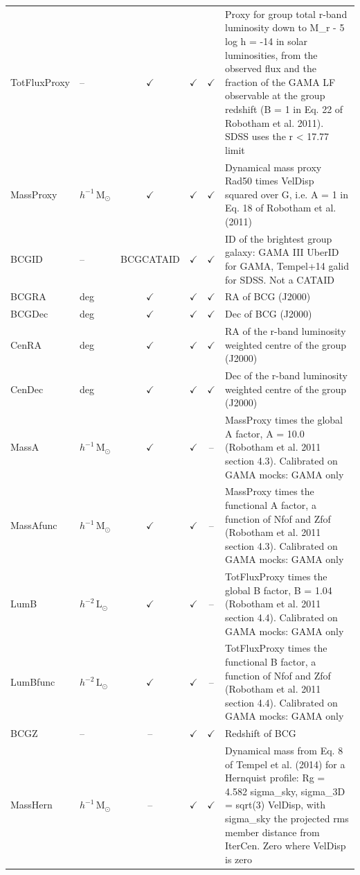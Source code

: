 \begin{tabular}{llcccp{7.5cm}}
TotFluxProxy & -- & $\checkmark$ & $\checkmark$ & $\checkmark$ & Proxy for group total r-band luminosity down to M\_r - 5 log h = -14 in solar luminosities, from the observed flux and the fraction of the GAMA LF observable at the group redshift (B = 1 in Eq. 22 of Robotham et al. 2011). SDSS uses the r < 17.77 limit \\
MassProxy & $h^{-1}\,\mathrm{M}_\odot$ & $\checkmark$ & $\checkmark$ & $\checkmark$ & Dynamical mass proxy Rad50 times VelDisp squared over G, i.e. A = 1 in Eq. 18 of Robotham et al. (2011) \\
BCGID & -- & BCGCATAID & $\checkmark$ & $\checkmark$ & ID of the brightest group galaxy: GAMA III UberID for GAMA, Tempel+14 galid for SDSS. Not a CATAID \\
BCGRA & deg & $\checkmark$ & $\checkmark$ & $\checkmark$ & RA of BCG (J2000) \\
BCGDec & deg & $\checkmark$ & $\checkmark$ & $\checkmark$ & Dec of BCG (J2000) \\
CenRA & deg & $\checkmark$ & $\checkmark$ & $\checkmark$ & RA of the r-band luminosity weighted centre of the group (J2000) \\
CenDec & deg & $\checkmark$ & $\checkmark$ & $\checkmark$ & Dec of the r-band luminosity weighted centre of the group (J2000) \\
MassA & $h^{-1}\,\mathrm{M}_\odot$ & $\checkmark$ & $\checkmark$ & -- & MassProxy times the global A factor, A = 10.0 (Robotham et al. 2011 section 4.3). Calibrated on GAMA mocks: GAMA only \\
MassAfunc & $h^{-1}\,\mathrm{M}_\odot$ & $\checkmark$ & $\checkmark$ & -- & MassProxy times the functional A factor, a function of Nfof and Zfof (Robotham et al. 2011 section 4.3). Calibrated on GAMA mocks: GAMA only \\
LumB & $h^{-2}\,\mathrm{L}_\odot$ & $\checkmark$ & $\checkmark$ & -- & TotFluxProxy times the global B factor, B = 1.04 (Robotham et al. 2011 section 4.4). Calibrated on GAMA mocks: GAMA only \\
LumBfunc & $h^{-2}\,\mathrm{L}_\odot$ & $\checkmark$ & $\checkmark$ & -- & TotFluxProxy times the functional B factor, a function of Nfof and Zfof (Robotham et al. 2011 section 4.4). Calibrated on GAMA mocks: GAMA only \\
BCGZ & -- & -- & $\checkmark$ & $\checkmark$ & Redshift of BCG \\
MassHern & $h^{-1}\,\mathrm{M}_\odot$ & -- & $\checkmark$ & $\checkmark$ & Dynamical mass from Eq. 8 of Tempel et al. (2014) for a Hernquist profile: Rg = 4.582 sigma\_sky, sigma\_3D = sqrt(3) VelDisp, with sigma\_sky the projected rms member distance from IterCen. Zero where VelDisp is zero \\

\end{tabular}
